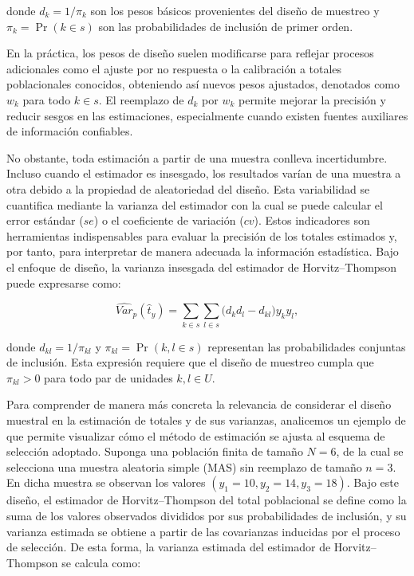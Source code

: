 \documentclass[
  spanish,
  12pt,
]{book}
\begin{document}
donde \(d_k = 1/\pi_k\) son los pesos básicos provenientes del diseño de muestreo y \(\pi_k = \Pr(k \in s)\) son las probabilidades de inclusión de primer orden.

En la práctica, los pesos de diseño suelen modificarse para reflejar procesos adicionales como el ajuste por no respuesta o la calibración a totales poblacionales conocidos, obteniendo así nuevos pesos ajustados, denotados como \(w_k\) para todo \(k \in s\). El reemplazo de \(d_k\) por \(w_k\) permite mejorar la precisión y reducir sesgos en las estimaciones, especialmente cuando existen fuentes auxiliares de información confiables.

No obstante, toda estimación a partir de una muestra conlleva incertidumbre. Incluso cuando el estimador es insesgado, los resultados varían de una muestra a otra debido a la propiedad de aleatoriedad del diseño. Esta variabilidad se cuantifica mediante la varianza del estimador con la cual se puede calcular el error estándar (\(se\)) o el coeficiente de variación (\(cv\)). Estos indicadores son herramientas indispensables para evaluar la precisión de los totales estimados y, por tanto, para interpretar de manera adecuada la información estadística. Bajo el enfoque de diseño, la varianza insesgada del estimador de Horvitz--Thompson puede expresarse como:

\[
\widehat{Var}_p(\hat{t}_{y}) = \sum_{k \in s} \sum_{l \in s} \bigl( d_k d_l - d_{kl} \bigr) y_k y_l,
\]

donde \(d_{kl} = 1/\pi_{kl}\) y \(\pi_{kl} = \Pr(k,l \in s)\) representan las probabilidades conjuntas de inclusión. Esta expresión requiere que el diseño de muestreo cumpla que \(\pi_{kl} > 0\) para todo par de unidades \(k,l \in U\).

Para comprender de manera más concreta la relevancia de considerar el diseño muestral en la estimación de totales y de sus varianzas, analicemos un ejemplo de \citet{UNhandbook} que permite visualizar cómo el método de estimación se ajusta al esquema de selección adoptado. Suponga una población finita de tamaño \(N=6\), de la cual se selecciona una muestra aleatoria simple (MAS) sin reemplazo de tamaño \(n=3\). En dicha muestra se observan los valores \((y_1=10, y_2=14, y_3=18)\). Bajo este diseño, el estimador de Horvitz--Thompson del total poblacional se define como la suma de los valores observados divididos por sus probabilidades de inclusión, y su varianza estimada se obtiene a partir de las covarianzas inducidas por el proceso de selección. De esta forma, la varianza estimada del estimador de Horvitz--Thompson se calcula como:
\end{document}
